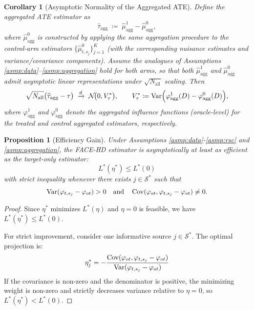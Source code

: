 \documentclass{article}
\newtheorem{corollary}[theorem]{Corollary}
\newtheorem{proposition}[theorem]{Proposition}
\begin{document}
\begin{corollary}[Asymptotic Normality of the Aggregated ATE]\label{cor:ate_agg}
Define the aggregated ATE estimator as
\[
\widehat{\tau}_{\text{agg}}
\;\coloneqq\;
\widehat{\mu}^1_{\text{agg}}-\widehat{\mu}^0_{\text{agg}},
\]
where $\widehat{\mu}^0_{\text{agg}}$ is constructed by applying the same aggregation procedure to the control-arm estimators $\{\widehat{\mu}^0_{t,s_j}\}_{j=1}^K$ (with the corresponding nuisance estimates and variance/covariance components).
Assume the analogues of Assumptions \ref{asmp:data}--\ref{asmp:aggregation} hold for both arms, so that both $\widehat{\mu}^1_{\text{agg}}$ and $\widehat{\mu}^0_{\text{agg}}$ admit asymptotic linear representations under $\sqrt{N_{\mathrm{all}}}$ scaling.
Then
\[
\sqrt{N_{\mathrm{all}}}\big(\widehat{\tau}_{\text{agg}}-\tau\big)
\;\xrightarrow{d}\;
\mathcal{N}\!\big(0,V_\tau^*\big),
\qquad
V_\tau^* \coloneqq
\operatorname{Var}\!\Big(\varphi_{\mathrm{agg}}^{1}(D)-\varphi_{\mathrm{agg}}^{0}(D)\Big),
\]
where $\varphi_{\mathrm{agg}}^{1}$ and $\varphi_{\mathrm{agg}}^{0}$ denote the aggregated influence functions (oracle-level) for the treated and control aggregated estimators, respectively.
\end{corollary}

\begin{proposition}[Efficiency Gain]\label{prop:efficiency}
Under Assumptions \ref{asmp:data}-\ref{asmp:rsc} and \ref{asmp:aggregation}, the FACE-HD estimator is asymptotically at least as efficient as the target-only estimator:
\[
L^*(\eta^*) \le L^*(0)
\]
with strict inequality whenever there exists $j\in\mathcal{S}^*$ such that
\[
\operatorname{Var}(\varphi_{t,s_j} - \varphi_{ot}) > 0
\quad\text{and}\quad
\operatorname{Cov}(\varphi_{ot}, \varphi_{t,s_j} - \varphi_{ot}) \ne 0.
\]
\end{proposition}

\begin{proof}
Since $\eta^*$ minimizes $L^*(\eta)$ and $\eta = 0$ is feasible, we have $L^*(\eta^*) \le L^*(0)$.

For strict improvement, consider one informative source $j \in \mathcal{S}^*$. The optimal projection is:
\[
\eta^*_j = -\frac{\text{Cov}(\varphi_{ot}, \varphi_{t,s_j} - \varphi_{ot})}{\operatorname{Var}(\varphi_{t,s_j} - \varphi_{ot})}
\]
If the covariance is non-zero and the denominator is positive, the minimizing weight is non-zero and strictly decreases variance relative to $\eta=0$, so $L^*(\eta^*) < L^*(0)$.
\end{proof}



\end{document}
